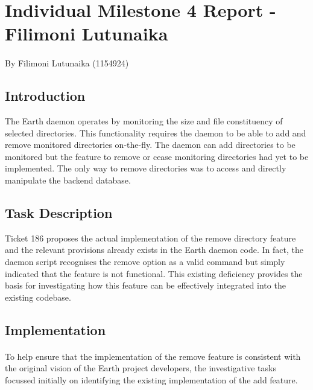 \documentclass[10pt,a4,oneside]{article}
\begin{document}
\newpage

\section{Individual Milestone 4 Report - Filimoni Lutunaika}

\paragraph{} By Filimoni Lutunaika (1154924)

\subsection*{Introduction}

The Earth daemon operates by monitoring the size and file constituency of 
selected directories. This functionality requires the daemon to be able to 
add and remove monitored directories on-the-fly. The daemon can add 
directories to be monitored but the feature to remove or cease monitoring 
directories had yet to be implemented. The only way to remove directories 
was to access and directly manipulate the backend database.


\paragraph{}

\subsection*{Task Description}

Ticket 186 proposes the actual implementation of the remove directory 
feature and the relevant provisions already exists in the Earth daemon 
code. In fact, the daemon script recognises the remove option as a valid 
command but simply indicated that the feature is not functional. This 
existing deficiency provides the basis for investigating how this feature 
can be effectively integrated into the existing codebase.



\newpage

\subsection*{Implementation}

\paragraph{}
To help ensure that the implementation of the remove feature is consistent 
with the original vision of the Earth project developers, the investigative 
tasks focussed initially on identifying the existing implementation of the 
add feature. 
\end{document}
